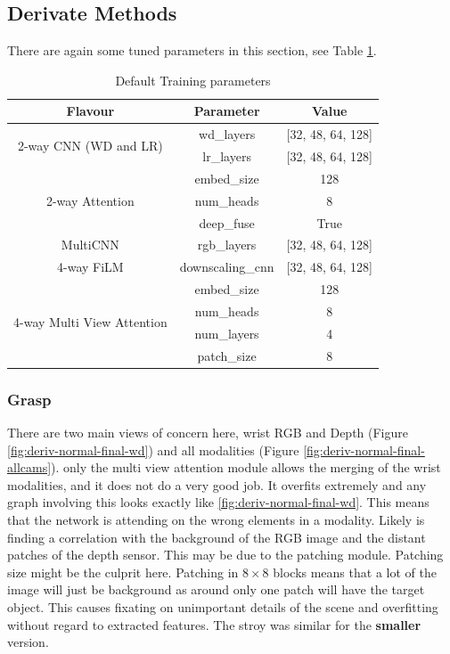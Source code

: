 \subsection{Derivate Methods}
There are again some tuned parameters in this section, see Table \ref{tab:derivative-params}.

\begin{table}[H]
\centering
  \begin{tabular}{|| c  c  c ||}
  \hline
  Flavour & Parameter & Value \\
  \hline
  \multirow{2}{*}{2-way CNN (WD and LR)} & wd\_layers & [32, 48, 64, 128]\\
  & lr\_layers & [32, 48, 64, 128]\\
  \hline
  \multirow{3}{*}{2-way Attention} & embed\_size & 128 \\
  & num\_heads & 8 \\
  & deep\_fuse & True \\
  \hline
  \multirow{1}{*}{MultiCNN} & rgb\_layers & [32, 48, 64, 128] \\
  \hline
  \multirow{1}{*}{4-way FiLM} & downscaling\_cnn & [32, 48, 64, 128] \\
  \hline
  \multirow{4}{*}{4-way Multi View Attention} & embed\_size & 128 \\
  & num\_heads & 8 \\
  & num\_layers & 4 \\
  & patch\_size & 8 \\
  \hline
  \end{tabular}\caption{Default Training parameters}\label{tab:derivative-params}
\end{table}

\subsubsection{Grasp}
There are two main views of concern here, wrist RGB and Depth (Figure \ref{fig:deriv-normal-final-wd}) and all modalities (Figure \ref{fig:deriv-normal-final-allcams}). only the multi view attention module allows the merging of the wrist modalities, and it does not do a very good job. It overfits extremely and any graph involving this looks exactly like \ref{fig:deriv-normal-final-wd}. This means that the network is attending on the wrong elements in a modality. Likely is finding a correlation with the background of the RGB image and the distant patches of the depth sensor. This may be due to the patching module. Patching size might be the culprit here. Patching in \(8 \times 8\) blocks means that a lot of the image will just be background as around only one patch will have the target object. This causes fixating on unimportant details of the scene and overfitting without regard to extracted features. The stroy was similar for the \textbf{smaller} version.

